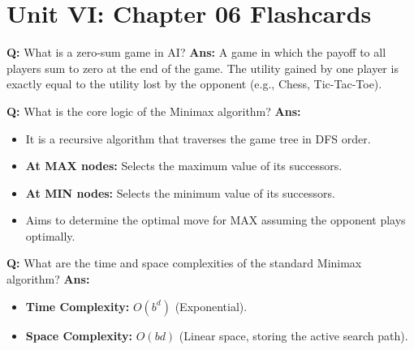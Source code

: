 \documentclass[10pt,a4paper,twocolumn]{article}
\begin{document}
\section*{Unit VI: Chapter 06 Flashcards}

\begin{tcolorbox}[
  colback=white,
  colframe=UnitColorSix,
  colbacktitle=gray!10!white,
  coltitle=black,
  fonttitle=\bfseries\sffamily\small,
  title={Unit VI $\bullet$ Card 1: Zero-Sum Game},
  boxrule=1.2pt,
  arc=2mm,
  outer arc=2mm,
  boxsep=1.5mm,
  top=1mm,
  bottom=1mm,
  left=1.5mm,
  right=1.5mm,
  before skip=2.5mm,
  after skip=2.5mm
]
\textbf{Q:} What is a zero-sum game in AI?
\tcbline
\textbf{Ans:} A game in which the payoff to all players sum to zero at the end of the game. The utility gained by one player is exactly equal to the utility lost by the opponent (e.g., Chess, Tic-Tac-Toe).
\end{tcolorbox}


\begin{tcolorbox}[
  colback=white,
  colframe=UnitColorSix,
  colbacktitle=gray!10!white,
  coltitle=black,
  fonttitle=\bfseries\sffamily\small,
  title={Unit VI $\bullet$ Card 2: Minimax Algorithm},
  boxrule=1.2pt,
  arc=2mm,
  outer arc=2mm,
  boxsep=1.5mm,
  top=1mm,
  bottom=1mm,
  left=1.5mm,
  right=1.5mm,
  before skip=2.5mm,
  after skip=2.5mm
]
\textbf{Q:} What is the core logic of the Minimax algorithm?
\tcbline
\textbf{Ans:} \begin{itemize}
  \item   It is a recursive algorithm that traverses the game tree in DFS order.
  \item   \textbf{At MAX nodes:} Selects the maximum value of its successors.
  \item   \textbf{At MIN nodes:} Selects the minimum value of its successors.
  \item   Aims to determine the optimal move for MAX assuming the opponent plays optimally.
\end{itemize}
\end{tcolorbox}


\begin{tcolorbox}[
  colback=white,
  colframe=UnitColorSix,
  colbacktitle=gray!10!white,
  coltitle=black,
  fonttitle=\bfseries\sffamily\small,
  title={Unit VI $\bullet$ Card 3: Minimax Complexities},
  boxrule=1.2pt,
  arc=2mm,
  outer arc=2mm,
  boxsep=1.5mm,
  top=1mm,
  bottom=1mm,
  left=1.5mm,
  right=1.5mm,
  before skip=2.5mm,
  after skip=2.5mm
]
\textbf{Q:} What are the time and space complexities of the standard Minimax algorithm?
\tcbline
\textbf{Ans:} \begin{itemize}
  \item   \textbf{Time Complexity:} $O(b^d)$ (Exponential).
  \item   \textbf{Space Complexity:} $O(bd)$ (Linear space, storing the active search path).
\end{itemize}
\end{tcolorbox}
\end{document}
